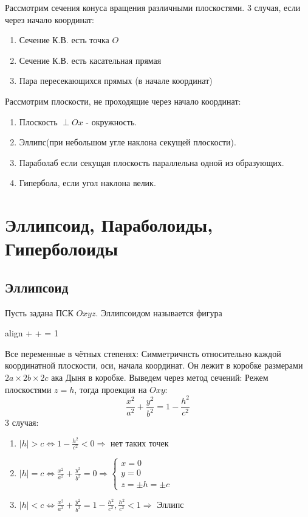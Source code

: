 \documentclass[oneside]{book}
\newcommand{\boxedeq}[2]{\begin{empheq}[box={\fboxsep=6pt\fbox}]{align}\label{#1}#2\end{empheq}}
\begin{document}
\begin{enumerate}
\begin{itemize}
\begin{enumerate}
Рассмотрим сечения конуса вращения различными плоскостями. 3 случая, если через начало координат:
\begin{enumerate}
\item Сечение К.В. есть точка $O$
\item Сечение К.В. есть касательная прямая
\item Пара пересекающихся прямых (в начале координат)
\end{enumerate}

Рассмотрим плоскости, не проходящие через начало координат:
\begin{enumerate}
\item Плоскость $\perp Ox$ - окружность.
\item Эллипс(при небольшом угле наклона секущей плоскости).
\item Параболаб если секущая плоскость параллельна одной из образующих.
\item Гипербола, если угол наклона велик.
\end{enumerate}

\chapter{Эллипсоид, Параболоиды, Гиперболоиды\\}

\section{Эллипсоид}

Пусть задана ПСК $Oxyz$. Эллипсоидом называется фигура
\boxedeq{eq:*}{ +  + \frac{z^2}{c^2} = 1}

Все переменные в чётных степенях: Симметричнсть относительно каждой координатной плоскости, оси, начала координат.
Он лежит в коробке размерами $2a \times 2b \times 2c$ ака Дыня в коробке.
Выведем через метод сечений: Режем плоскостями $z = h$, тогда проекция на $Oxy$:
\begin{equation}
  \frac{x^2}{a^2} + \frac{y^2}{b^2} = 1 - \frac{h^2}{c^2}
\end{equation}
3 случая:
\begin{enumerate}

\item $ |h| > c \Leftrightarrow 1 - \frac{h^2}{c^2} < 0 \Rightarrow$ нет таких точек
\item $ |h| = c \Leftrightarrow \frac{x^2}{a^2} + \frac{y^2}{b^2} = 0 \Rightarrow \begin{cases} x = 0 \\ y = 0 \\ z = \pm h = \pm c \end{cases} $
\item $ |h| < c \Leftrightarrow \frac{x^2}{a^2} + \frac{y^2}{b^2}  = 1 - \frac{h^2}{c^2},  \frac{h^2}{c^2} < 1 \Rightarrow  $ Эллипс
  

\end{enumerate}
\end{enumerate}
\end{itemize}
\end{enumerate}
\end{document}
